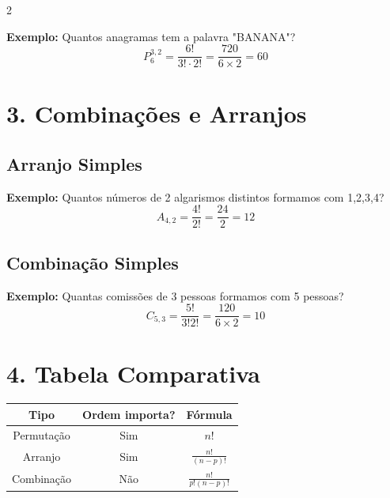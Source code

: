 \documentclass[11pt]{article}
\begin{document}
\begin{multicols}{2}
\vspace{5mm}

\textbf{Exemplo:}
Quantos anagramas tem a palavra "BANANA"?
\[
P_6^{3,2} = \frac{6!}{3! \cdot 2!} = \frac{720}{6 \times 2} = 60
\]

\section*{3. Combinações e Arranjos}

\subsection*{Arranjo Simples}


\vspace{5mm}

\textbf{Exemplo:}
Quantos números de 2 algarismos distintos formamos com {1,2,3,4}?
\[
A_{4,2} = \frac{4!}{2!} = \frac{24}{2} = 12
\]

\subsection*{Combinação Simples}


\vspace{5mm}

\textbf{Exemplo:}
Quantas comissões de 3 pessoas formamos com 5 pessoas?
\[
C_{5,3} = \frac{5!}{3!2!} = \frac{120}{6 \times 2} = 10
\]

\section*{4. Tabela Comparativa}

\begin{center}
\begin{tabular}{|c|c|c|}
\hline
\textbf{Tipo} & \textbf{Ordem importa?} & \textbf{Fórmula} \\
\hline
Permutação & Sim & $n!$ \\
\hline
Arranjo & Sim & $\frac{n!}{(n-p)!}$ \\
\hline
Combinação & Não & $\frac{n!}{p!(n-p)!}$ \\
\hline
\end{tabular}
\end{center}


\end{multicols}
\end{document}
